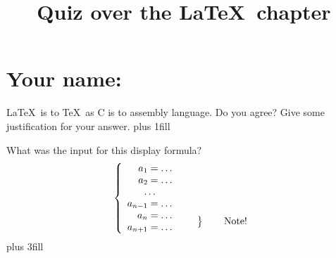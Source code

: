 \documentclass{artikel3}
\begin{document}
\pagestyle{empty}
\title{Quiz over the \LaTeX\ chapter}
\author{}\date{}\maketitle

\section*{Your name:}

\vskip1cm

\LaTeX\ is to \TeX\ as C is to assembly language. Do you agree?
Give some justification for your answer.
\vskip 0pt plus 1fill

What was the input for this display formula?
\[ \left\{\begin{array}{r}a_1=\ldots\\ a_2=\ldots\\ 
  \multicolumn{1}{c}\ldots\\
  a_{n-1}=\ldots\\ a_n=\ldots\\ a_{n+1}=\ldots
  \end{array}\right.
%
\left.\begin{array}{c}\\ \\ \\ \\
        \left.\begin{array}{c}\\\end{array}\right\}
        \qquad\mathrm{Note!}
\end{array}\right.
\]
\vskip 0pt plus 3fill
\end{document}
